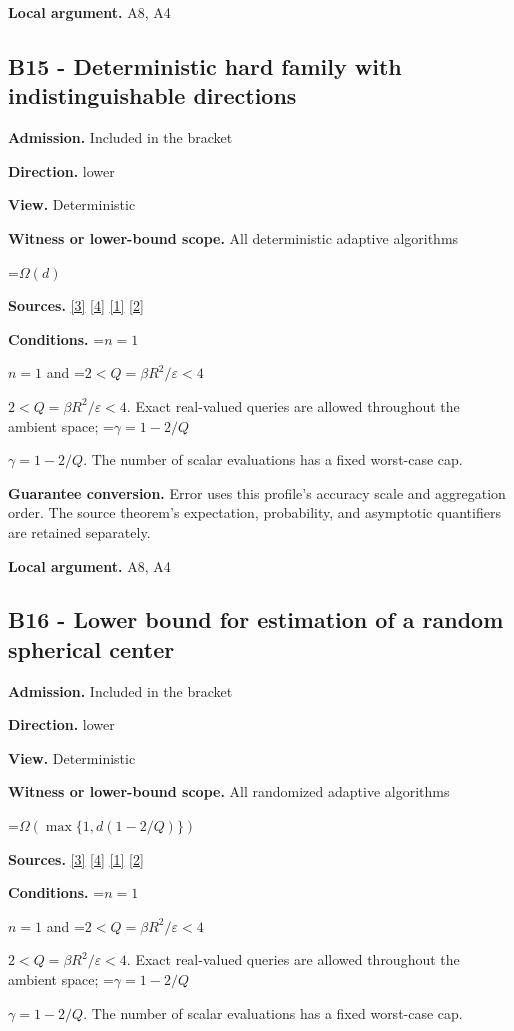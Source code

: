 \documentclass[10pt,a4paper]{article}
\newcommand{\AtlasMath}[1]{\par\begingroup\centering\setbox0=\hbox{$\displaystyle #1$}\ifdim\wd0>1.4\linewidth\typeout{ATLAS WIDE FORMULA: \the\wd0}\fi\ifdim\wd0>\linewidth\resizebox{\linewidth}{!}{\box0}\else\box0\fi\par\endgroup}
\newcommand{\AtlasInlineMath}[1]{\begingroup\setbox0=\hbox{$#1$}\ifdim\wd0>.4\linewidth\endgroup\AtlasMath{#1}\else\endgroup$#1$\fi}
\begin{document}
\textbf{Local argument.} A8, A4

\subsection{B15 - Deterministic hard family with indistinguishable directions}
\textbf{Admission.} Included in the bracket

\textbf{Direction.} lower

\textbf{View.} Deterministic

\textbf{Witness or lower-bound scope.} All deterministic adaptive algorithms

\AtlasMath{\Omega(d)}
\textbf{Sources.} \href{https://arxiv.org/html/2607.16558v2}{[3]} \href{https://www.mathnet.ru/php/archive.phtml?jrnid=mzm&option_lang=eng&paperid=1697&wshow=paper}{[4]} \href{https://arxiv.org/html/2610.00345v1}{[1]} \href{https://arxiv.org/abs/2109.08858}{[2]}

\textbf{Conditions.} \AtlasInlineMath{n=1} and \AtlasInlineMath{2<Q=\beta R^2/\varepsilon<4}. Exact real-valued queries are allowed throughout the ambient space; \AtlasInlineMath{\gamma=1-2/Q}. The number of scalar evaluations has a fixed worst-case cap.

\textbf{Guarantee conversion.} Error uses this profile's accuracy scale and aggregation order. The source theorem's expectation, probability, and asymptotic quantifiers are retained separately.

\textbf{Local argument.} A8, A4

\subsection{B16 - Lower bound for estimation of a random spherical center}
\textbf{Admission.} Included in the bracket

\textbf{Direction.} lower

\textbf{View.} Deterministic

\textbf{Witness or lower-bound scope.} All randomized adaptive algorithms

\AtlasMath{\Omega(\max\{1,d(1-2/Q)\})}
\textbf{Sources.} \href{https://arxiv.org/html/2607.16558v2}{[3]} \href{https://www.mathnet.ru/php/archive.phtml?jrnid=mzm&option_lang=eng&paperid=1697&wshow=paper}{[4]} \href{https://arxiv.org/html/2610.00345v1}{[1]} \href{https://arxiv.org/abs/2109.08858}{[2]}

\textbf{Conditions.} \AtlasInlineMath{n=1} and \AtlasInlineMath{2<Q=\beta R^2/\varepsilon<4}. Exact real-valued queries are allowed throughout the ambient space; \AtlasInlineMath{\gamma=1-2/Q}. The number of scalar evaluations has a fixed worst-case cap.
\end{document}
